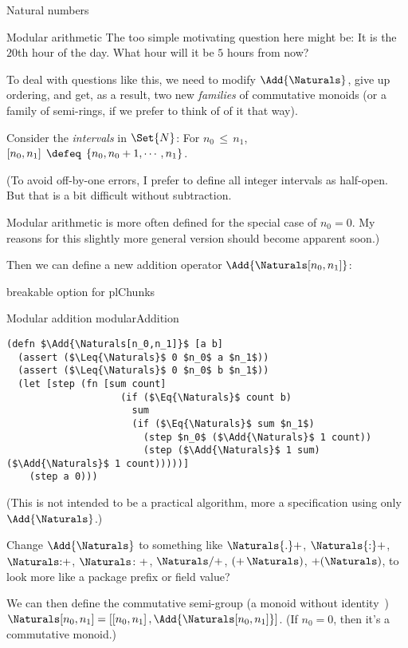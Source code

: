 \documentclass[12pt]{PalisadesLakesBook}
\begin{document}
\begin{plSection}{Natural numbers}
\begin{plSection}{Modular arithmetic}
The too simple motivating question here might be:
It is the $20$th hour of the day.
What hour will it be $5$ hours
from now?

To deal with questions like this, we need to modify 
$\Add{\Naturals}$,
give up ordering, and get, as a result, two new \emph{families} of 
commutative monoids (or a family of semi-rings, 
if we prefer to think of of it that way).

Consider the \emph{intervals} in $\Set{N}$:
For $n_{0}\,\leq\, n_{1}$, 
$\left[ n_{0}, n_{1} \right] \; \defeq \;
\left\{ n_{0}, n_{0} + 1, \cdots , n_{1} \right\}$.

(\NOTE To avoid off-by-one errors, 
I prefer to define all integer intervals as half-open.
But that is a bit difficult without subtraction.

\NOTE Modular arithmetic is more often defined for the special 
case of $n_0=0$.
My reasons for this slightly more general
version should become apparent soon.)

Then we can define a new addition operator 
$\Add{ \Naturals[n_0,n_1] }$:

\TODO breakable option for plChunks

\begin{plAlgorithm}
[breakable=false]
{Modular addition}
{modularAddition}
\begin{lstlisting}[language=pseudocode]
(defn $\Add{\Naturals[n_0,n_1]}$ [a b]
  (assert ($\Leq{\Naturals}$ 0 $n_0$ a $n_1$))
  (assert ($\Leq{\Naturals}$ 0 $n_0$ b $n_1$))
  (let [step (fn [sum count]
                    (if ($\Eq{\Naturals}$ count b)
                      sum
                      (if ($\Eq{\Naturals}$ sum $n_1$)
                        (step $n_0$ ($\Add{\Naturals}$ 1 count))
                        (step ($\Add{\Naturals}$ 1 sum) ($\Add{\Naturals}$ 1 count)))))]
    (step a 0)))
\end{lstlisting}
\end{plAlgorithm}
(\NOTE This is not intended to be a practical algorithm,
more a specification using only $\Add{\Naturals}$.)

\TODO Change $\Add{\Naturals}$ to something like
$\mathsf{\Naturals{.}+}$, 
$\mathsf{\Naturals{:}+}$, 
$\Naturals\mathsf{{:}+}$, 
$\Naturals\mathsf{{\colon}+}$, 
$\Naturals\mathsf{/+}$, 
$\mathsf{(+ \, \Naturals)}$, 
$\mathsf{+(\Naturals)}$, 
to look more like a package prefix or field value?

We can then define the commutative semi-group 
(a monoid without identity~\cite{wiki:Semigroup})
$
\Naturals[n_0,n_1] =
\left[ 
\left[ n_{0}, n_{1} \right], 
\Add{\Naturals[n_0,n_1]}
\right]
$.
(If $n_0=0$, then it's a commutative monoid.)


\end{plSection}
\end{plSection}
\end{document}
